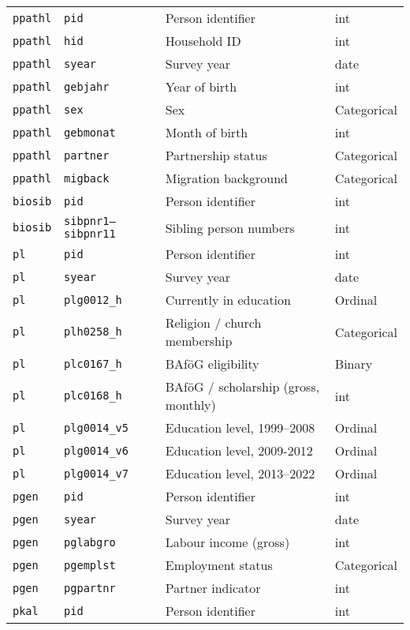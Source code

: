 \begin{longtable}{llll}
\bottomrule
\endlastfoot
\texttt{ppathl} & \texttt{pid} & Person identifier & int \\
\texttt{ppathl} & \texttt{hid} & Household ID & int \\
\texttt{ppathl} & \texttt{syear} & Survey year & date \\
\texttt{ppathl} & \texttt{gebjahr} & Year of birth & int \\
\texttt{ppathl} & \texttt{sex} & Sex & Categorical \\
\texttt{ppathl} & \texttt{gebmonat} & Month of birth & int \\
\texttt{ppathl} & \texttt{partner} & Partnership status & Categorical \\
\texttt{ppathl} & \texttt{migback} & Migration background & Categorical \\
\texttt{biosib} & \texttt{pid} & Person identifier & int \\
\texttt{biosib} & \texttt{sibpnr1--sibpnr11} & Sibling person numbers & int \\
\texttt{pl} & \texttt{pid} & Person identifier & int \\
\texttt{pl} & \texttt{syear} & Survey year & date \\
\texttt{pl} & \texttt{plg0012\_h} & Currently in education & Ordinal \\
\texttt{pl} & \texttt{plh0258\_h} & Religion / church membership & Categorical \\
\texttt{pl} & \texttt{plc0167\_h} & BAföG eligibility & Binary \\
\texttt{pl} & \texttt{plc0168\_h} & BAföG / scholarship (gross, monthly) & int \\
\texttt{pl} & \texttt{plg0014\_v5} & Education level, 1999--2008 & Ordinal \\
\texttt{pl} & \texttt{plg0014\_v6} & Education level, 2009-2012 & Ordinal \\
\texttt{pl} & \texttt{plg0014\_v7} & Education level, 2013--2022 & Ordinal \\
\texttt{pgen} & \texttt{pid} & Person identifier & int \\
\texttt{pgen} & \texttt{syear} & Survey year & date \\
\texttt{pgen} & \texttt{pglabgro} & Labour income (gross) & int \\
\texttt{pgen} & \texttt{pgemplst} & Employment status & Categorical \\
\texttt{pgen} & \texttt{pgpartnr} & Partner indicator & int \\
\texttt{pkal} & \texttt{pid} & Person identifier & int \\

\end{longtable}
